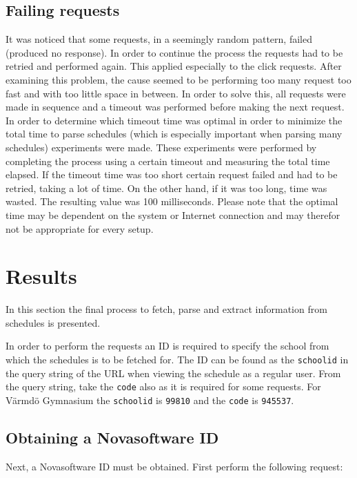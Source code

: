 \documentclass{article}
\begin{document}
	\subsection{Failing requests}
	It was noticed that some requests, in a seemingly random pattern, failed (produced no response). In order to continue the process the requests had to be retried and performed again. This applied especially to the click requests. After examining this problem, the cause seemed to be performing too many request too fast and with too little space in between. In order to solve this, all requests were made in sequence and a timeout was performed before making the next request. In order to determine which timeout time was optimal in order to minimize the total time to parse schedules (which is especially important when parsing many schedules) experiments were made. These experiments were performed by completing the process using a certain timeout and measuring the total time elapsed. If the timeout time was too short certain request failed and had to be retried, taking a lot of time. On the other hand, if it was too long, time was wasted. The resulting value was 100 milliseconds. Please note that the optimal time may be dependent on the system or Internet connection and may therefor not be appropriate for every setup.
	
	\section{Results}
	In this section the final process to fetch, parse and extract information from schedules is presented.
	
	In order to perform the requests an ID is required to specify the school from which the schedules is to be fetched for. The ID can be found as the \texttt{schoolid} in the query string of the URL when viewing the schedule as a regular user. From the query string, take the \texttt{code} also as it is required for some requests. For Värmdö Gymnasium the \texttt{schoolid} is \texttt{99810} and the \texttt{code} is \texttt{945537}.
	
	\subsection{Obtaining a Novasoftware ID}
	Next, a Novasoftware ID must be obtained. First perform the following request:
	
\end{document}
